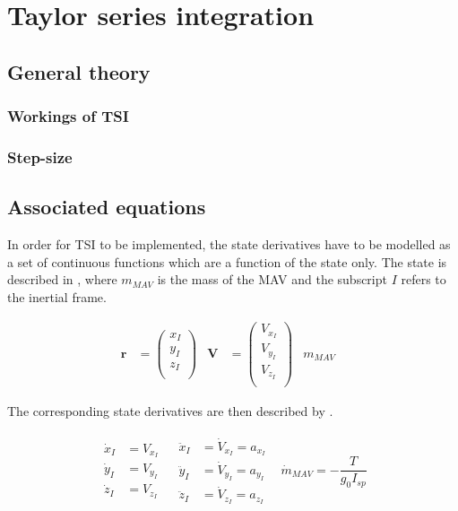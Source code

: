 \chapter{Taylor series integration} %
\label{ch:tsi}

\section{General theory}
\label{sec:genTsiTheory}

\subsection{Workings of \ac{TSI}}
\label{subsec:workTsi}

\subsection{Step-size}
\label{subsec:stepSizeTsi}

\section{Associated equations}
\label{sec:assEq}
In order for \ac{TSI} to be implemented, the state derivatives have to be modelled as a set of continuous functions which are a function of the state only. The state is described in , where $m_{MAV}$ is the mass of the \ac{MAV} and the subscript $I$ refers to the inertial frame.

\begin{align} \label{eq:state}
\mathbf{r}&=\begin{pmatrix}
x_{I}\\
y_{I}\\
z_{I}\\
\end{pmatrix}
&
\mathbf{V}&=\begin{pmatrix}
V_{x_{I}} \\
V_{y_{I}} \\
V_{z_{I}}\\
\end{pmatrix}
&
m_{MAV}&
\end{align}

The corresponding state derivatives are then described by .

\begin{align} \label{eq:state_derivatives}
\begin{split} 
\dot{x}_{I}&=V_{x_{I}}\\
\dot{y}_{I}&=V_{y_{I}}\\
\dot{z}_{I}&=V_{z_{I}}
\end{split} 
&
\begin{split}
\ddot{x}_{I}&=\dot{V}_{x_{I}}=a_{x_{I}}\\
\ddot{y}_{I}&=\dot{V}_{y_{I}}=a_{y_{I}}\\
\ddot{z}_{I}&=\dot{V}_{z_{I}}=a_{z_{I}}
\end{split}
&
\dot{m}_{MAV}=-\dfrac{T}{g_{0}I_{sp}}
\end{align}

